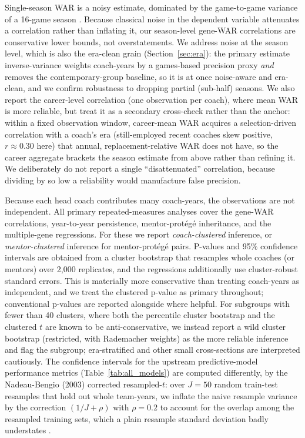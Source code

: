 \documentclass[USenglish]{article}
\theoremstyle{dgthm}
\theoremstyle{dgdef}
\begin{document}
Single-season WAR is a noisy estimate, dominated by the game-to-game variance of a 16-game season \citep{williamson2026war}. Because classical noise in the dependent variable attenuates a correlation rather than inflating it, our season-level gene-WAR correlations are conservative lower bounds, not overstatements. We address noise at the season level, which is also the era-clean grain (Section~\ref{sec:era}): the primary estimate inverse-variance weights coach-years by a games-based precision proxy \emph{and} removes the contemporary-group baseline, so it is at once noise-aware and era-clean, and we confirm robustness to dropping partial (sub-half) seasons. We also report the career-level correlation (one observation per coach), where mean WAR is more reliable, but treat it as a secondary cross-check rather than the anchor: within a fixed observation window, career-mean WAR acquires a selection-driven correlation with a coach's era (still-employed recent coaches skew positive, $r\approx0.30$ here) that annual, replacement-relative WAR does not have, so the career aggregate brackets the season estimate from above rather than refining it. We deliberately do not report a single ``disattenuated'' correlation, because dividing by so low a reliability would manufacture false precision.

Because each head coach contributes many coach-years, the observations are not independent. All primary repeated-measures analyses cover the gene-WAR correlations, year-to-year persistence, mentor-prot\'{e}g\'{e} inheritance, and the multiple-gene regressions. For these we report \emph{coach-clustered} inference, or \emph{mentor-clustered} inference for mentor-prot\'{e}g\'{e} pairs. P-values and 95\% confidence intervals are obtained from a cluster bootstrap that resamples whole coaches (or mentors) over 2{,}000 replicates, and the regressions additionally use cluster-robust standard errors. This is materially more conservative than treating coach-years as independent, and we treat the clustered p-value as primary throughout; conventional p-values are reported alongside where helpful. For subgroups with fewer than 40 clusters, where both the percentile cluster bootstrap and the clustered $t$ are known to be anti-conservative, we instead report a wild cluster bootstrap \citep{cameron2008} (restricted, with Rademacher weights) as the more reliable inference and flag the subgroup; era-stratified and other small cross-sections are interpreted cautiously. The confidence intervals for the upstream predictive-model performance metrics (Table~\ref{tab:all_models}) are computed differently, by the Nadeau-Bengio (2003) corrected resampled-$t$: over $J=50$ random train-test resamples that hold out whole team-years, we inflate the naive resample variance by the correction $(1/J + \rho)$ with $\rho=0.2$ to account for the overlap among the resampled training sets, which a plain resample standard deviation badly understates \citep{nadeau2003}.
\end{document}
